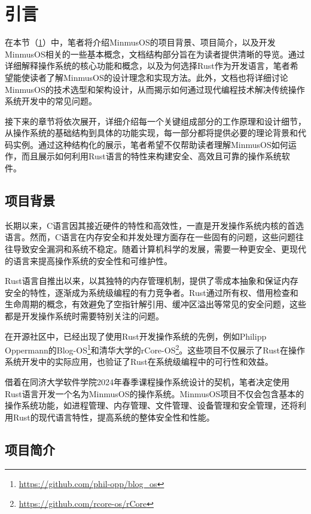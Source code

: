 \section{引言}\label{sec:Introduction}

在本节（\cref{sec:Introduction}）中，笔者将介绍MinmusOS的项目背景、项目简介，以及开发MinmusOS相关的一些基本概念，文档结构部分旨在为读者提供清晰的导览。通过详细解释操作系统的核心功能和概念，以及为何选择Rust作为开发语言，笔者希望能使读者了解MinmusOS的设计理念和实现方法。此外，文档也将详细讨论MinmusOS的技术选型和架构设计，从而揭示如何通过现代编程技术解决传统操作系统开发中的常见问题。

接下来的章节将依次展开，详细介绍每一个关键组成部分的工作原理和设计细节，从操作系统的基础结构到具体的功能实现，每一部分都将提供必要的理论背景和代码实例。通过这种结构化的展示，笔者希望不仅帮助读者理解MinmusOS如何运作，而且展示如何利用Rust语言的特性来构建安全、高效且可靠的操作系统软件。

\subsection{项目背景}

长期以来，C语言因其接近硬件的特性和高效性，一直是开发操作系统内核的首选语言。然而，C语言在内存安全和并发处理方面存在一些固有的问题，这些问题往往导致安全漏洞和系统不稳定。随着计算机科学的发展，需要一种更安全、更现代的语言来提高操作系统的安全性和可维护性。

Rust语言自推出以来，以其独特的内存管理机制，提供了零成本抽象和保证内存安全的特性，逐渐成为系统级编程的有力竞争者。Rust通过所有权、借用检查和生命周期的概念，有效避免了空指针解引用、缓冲区溢出等常见的安全问题，这些都是开发操作系统时需要特别关注的问题。

在开源社区中，已经出现了使用Rust开发操作系统的先例，例如Philipp Oppermann的Blog-OS\footnote{\url{https://github.com/phil-opp/blog\_os}}和清华大学的rCore-OS\footnote{\url{https://github.com/rcore-os/rCore}}。这些项目不仅展示了Rust在操作系统开发中的实际应用，也验证了Rust在系统级编程中的可行性和效益。

借着在同济大学软件学院2024年春季课程操作系统设计的契机，笔者决定使用Rust语言开发一个名为MinmusOS的操作系统。MinmusOS项目不仅会包含基本的操作系统功能，如进程管理、内存管理、文件管理、设备管理和安全管理，还将利用Rust的现代语言特性，提高系统的整体安全性和性能。

\subsection{项目简介}

